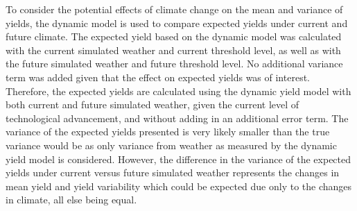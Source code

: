 To consider the potential effects of climate change on the mean and variance of yields, the dynamic model is used to compare expected yields under current and future climate. The expected yield based on the dynamic model was calculated with the current simulated weather and current threshold level, as well as with the future simulated weather and future threshold level. No additional variance term was added given that the effect on expected yields was of interest. Therefore, the expected yields are calculated using the dynamic yield model with both current and future simulated weather, given the current level of technological advancement, and without adding in an additional error term. The variance of the expected yields presented is very likely smaller than the true variance would be as only variance from weather as measured by the dynamic yield model is considered. However, the difference in the variance of the expected yields under current versus future simulated weather represents the changes in mean yield and yield variability which could be expected due only to the changes in climate, all else being equal.

